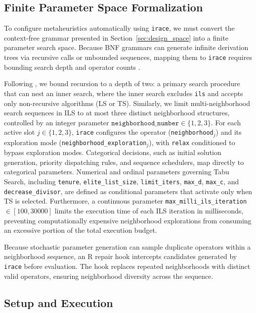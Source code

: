 \subsection{Finite Parameter Space Formalization}
\label{subsec:parameter_space}

To configure metaheuristics automatically using \texttt{irace}, we must convert the context-free grammar presented in Section~\ref{sec:design_space} into a finite parameter search space.
Because BNF grammars can generate infinite derivation trees via recursive calls or unbounded sequences, mapping them to \texttt{irace} requires bounding search depth and operator counts \citep{mascia2013grammars, mascia2014grammar, lopez2016irace}.

Following \citet{mascia2013grammars}, we bound recursion to a depth of two: a primary search procedure that can nest an inner search, where the inner search excludes \texttt{ils} and accepts only non-recursive algorithms (LS or TS).
Similarly, we limit multi-neighborhood search sequences in ILS to at most three distinct neighborhood structures, controlled by an integer parameter $\texttt{neighborhood\_number} \in \{1, 2, 3\}$.
For each active slot $j \in \{1, 2, 3\}$, \texttt{irace} configures the operator (\texttt{neighborhood}$_j$) and its exploration mode (\texttt{neighborhood\_exploration}$_j$), with \texttt{relax} conditioned to bypass exploration modes.
Categorical decisions, such as initial solution generation, priority dispatching rules, and sequence schedulers, map directly to categorical parameters.
Numerical and ordinal parameters governing Tabu Search, including \texttt{tenure}, \texttt{elite\_list\_size}, \texttt{limit\_iters}, \texttt{max\_d}, \texttt{max\_c}, and \texttt{decrease\_divisor}, are defined as conditional parameters that activate only when TS is selected.
Furthermore, a continuous parameter \texttt{max\_milli\_ils\_iteration} $\in [100, 30000]$ limits the execution time of each ILS iteration in milliseconds, preventing computationally expensive neighborhood explorations from consuming an excessive portion of the total execution budget.

Because stochastic parameter generation can sample duplicate operators within a neighborhood sequence, an R repair hook intercepts candidates generated by \texttt{irace} before evaluation. The hook replaces repeated neighborhoods with distinct valid operators, ensuring neighborhood diversity across the sequence.

\subsection{Setup and Execution}
\label{subsec:irace_setup}

